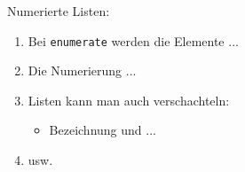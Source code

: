 \documentclass{article}
\begin{document}
Numerierte Listen:
\begin{enumerate}
 
\item Bei \texttt{enumerate}
werden die Elemente ...
 
\item Die Numerierung ...
 
\item Listen kann man auch
verschachteln:
  \begin{itemize}
  \item Bezeichnung und ...
  \end{itemize}
 
\item usw.
\end{enumerate}
   
\end{document}
